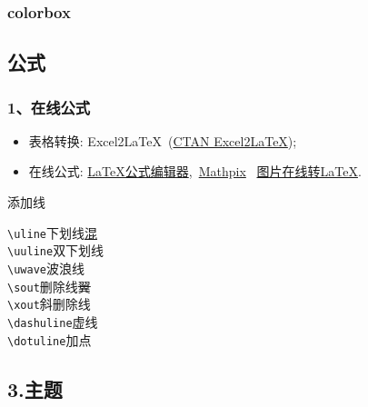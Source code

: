 \documentclass[12pt,aspectratio=169]{beamer}
\begin{document}
\begin{frame}
    \frametitle{colorbox}

\end{frame}


\subsection{公式}
\begin{frame}
    \frametitle{1、在线公式}

    \begin{itemize}
        \item<2-> 表格转换: Excel2\LaTeX~(\href{https://www.ctan.org/tex-archive/support/excel2latex/}{CTAN Excel2\LaTeX});
        \item<2-> 在线公式: \href{https://www.latexlive.com/}{LaTeX公式编辑器},~\href{https://mathpix.com/}{Mathpix}~ \href{https://mathf.itewqq.cn/}{图片在线转LaTeX}.
    \end{itemize}

\end{frame}

\begin{frame}[fragile]{添加线}
	\begin{multicols}{2}
		\verb|\uline|\hfill 下划线\qquad\uline{混}\\
		\verb|\uuline|\hfill 双下划线\qquad{}\\
		\verb|\uwave|\hfill 波浪线\qquad{}\\
		\verb|\sout|\hfill 删除线\qquad\sout{翼}\\
		\verb|\xout|\hfill 斜删除线\qquad{}\\
		\verb|\dashuline|\hfill 虚线\qquad{}\\
		\verb|\dotuline|\hfill 加点\qquad{}
	\end{multicols}
\end{frame}

\subsection{3.主题}
\end{document}
